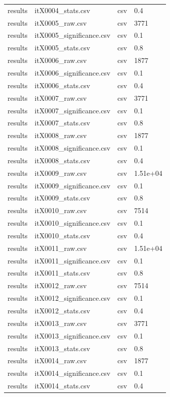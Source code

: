 \begin{landscape}
\begin{longtable}{p{}p{}p{}p{}}
results & itX0004\_stats.csv & csv & 0.4 \\
results & itX0005\_raw.csv & csv & 3771 \\
results & itX0005\_significance.csv & csv & 0.1 \\
results & itX0005\_stats.csv & csv & 0.8 \\
results & itX0006\_raw.csv & csv & 1877 \\
results & itX0006\_significance.csv & csv & 0.1 \\
results & itX0006\_stats.csv & csv & 0.4 \\
results & itX0007\_raw.csv & csv & 3771 \\
results & itX0007\_significance.csv & csv & 0.1 \\
results & itX0007\_stats.csv & csv & 0.8 \\
results & itX0008\_raw.csv & csv & 1877 \\
results & itX0008\_significance.csv & csv & 0.1 \\
results & itX0008\_stats.csv & csv & 0.4 \\
results & itX0009\_raw.csv & csv & 1.51e+04 \\
results & itX0009\_significance.csv & csv & 0.1 \\
results & itX0009\_stats.csv & csv & 0.8 \\
results & itX0010\_raw.csv & csv & 7514 \\
results & itX0010\_significance.csv & csv & 0.1 \\
results & itX0010\_stats.csv & csv & 0.4 \\
results & itX0011\_raw.csv & csv & 1.51e+04 \\
results & itX0011\_significance.csv & csv & 0.1 \\
results & itX0011\_stats.csv & csv & 0.8 \\
results & itX0012\_raw.csv & csv & 7514 \\
results & itX0012\_significance.csv & csv & 0.1 \\
results & itX0012\_stats.csv & csv & 0.4 \\
results & itX0013\_raw.csv & csv & 3771 \\
results & itX0013\_significance.csv & csv & 0.1 \\
results & itX0013\_stats.csv & csv & 0.8 \\
results & itX0014\_raw.csv & csv & 1877 \\
results & itX0014\_significance.csv & csv & 0.1 \\
results & itX0014\_stats.csv & csv & 0.4 \\

\end{longtable}
\end{landscape}
